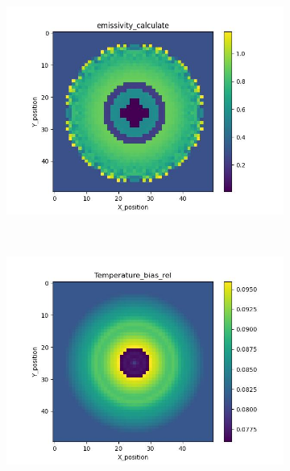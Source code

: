 \begin{figure}[htbp]
\begin{minipage}{\textwidth}
\begin{subfigure}{0.49\textwidth}
            \includegraphics[width=\textwidth]{figures/raw_data/31/linear/emi_cal.jpg}
        \end{subfigure}
    \end{minipage}\\
    \begin{minipage}{\textwidth}
        \centering
        \begin{subfigure}{0.49\textwidth}
            \centering
            \includegraphics[width=\textwidth]{figures/raw_data/5/linear/T_bias.jpg}
        \end{subfigure}
        \begin{subfigure}{0.49\textwidth}
            \centering

\end{subfigure}
\end{minipage}
\end{figure}
